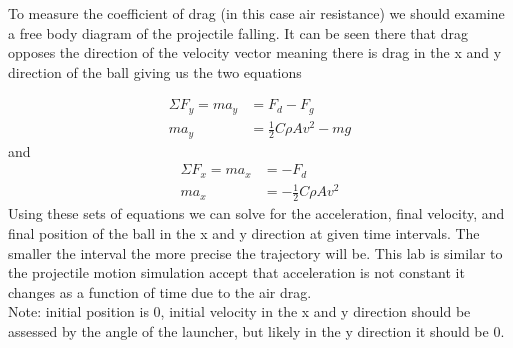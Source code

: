 \documentclass{article}
\begin{document}
    To measure the coefficient of drag (in this case air resistance) we should examine a free body diagram of the projectile falling. It can be seen there that drag opposes the direction of the velocity vector meaning there is drag in the x and y direction of the ball giving us the two equations

    \begin{align*}
        \Sigma{}F_y = ma_y &= F_d - F_g\\
        ma_y &= \frac{1}{2}C\rho{}Av^2 - mg
    \end{align*}
    and 
    \begin{align*}
        \Sigma{}F_x = ma_x &= -F_d\\
        ma_x &= -\frac{1}{2}C\rho{}Av^2
    \end{align*}
    Using these sets of equations we can solve for the acceleration, final velocity, and final position of the ball in the x and y direction at given time intervals. The smaller the interval the more precise the trajectory will be. This lab is similar to the projectile motion simulation accept that acceleration is not constant it changes as a function of time due to the air drag.\\

    Note: initial position is 0, initial velocity in the x and y direction should be assessed by the angle of the launcher, but likely in the y direction it should be 0. 
\end{document}
